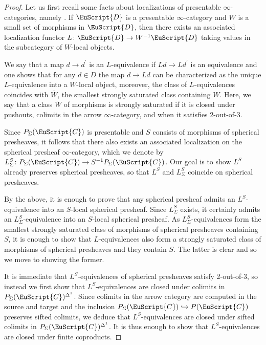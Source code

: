 \documentclass[oneside,a4paper]{amsart}
\newcommand{\euscr}[1]{\EuScript{#1}} %
\newcommand{\ccat}{\euscr{C}} %
\newcommand{\dcat}{\euscr{D}} %
\theoremstyle{plain}
\theoremstyle{definition}
\theoremstyle{remark}
\begin{document}
\begin{proof}
Let us first recall some facts about localizations of presentable $\infty$-categories, namely \cite[5.2.7.8, 5.5.4.15]{lurie_higher_topos_theory}.  If $\dcat$ is a presentable $\infty$-category and $W$ is a small set of morphisms in $\dcat$, then there exists an associated localization functor $L\colon \dcat \rightarrow W^{-1}\dcat$ taking values in the subcategory of $W$-local objects. 

We say that a map $d \rightarrow d^{\prime}$ is an $L$-equivalence if $Ld \rightarrow Ld^{\prime}$ is an equivalence and one shows that for any $d \in D$ the map $d \rightarrow Ld$ can be characterized as the unique $L$-equivalence into a $W$-local object, moreover, the class of $L$-equivalences coincides with $\overline{W}$,  the smallest strongly saturated class containing $W$. Here, we say that a class $\overline{W}$ of morphisms is strongly saturated if it is closed under pushouts, colimits in the arrow $\infty$-category, and when it satisfies 2-out-of-3. 

Since $P_{\Sigma}(\ccat)$ is presentable and $S$ consists of morphisms of spherical presheaves, it follows that there also exists an associated localization on the spherical presheaf $\infty$-category, which we denote by $L_{\Sigma}^{S} \colon P_{\Sigma}(\ccat) \rightarrow S^{-1} P_{\Sigma}(\ccat)$. Our goal is to show $L^{S}$ already preserves spherical presheaves, so that $L^{S}$ and $L_{\Sigma}^{S}$ coincide on spherical presheaves.

By the above, it is enough to prove that any spherical presheaf admits an $L^{S}$-equivalence into an $S$-local spherical presheaf. Since $L_{\Sigma}^{S}$ exists, it certainly admits an $L_{\Sigma}^{S}$-equivalence into an $S$-local spherical presheaf. As $L_{\Sigma}^{S}$-equivalences form the smallest strongly saturated class of morphisms of spherical presheaves containing $S$, it is enough to show that $L$-equivalences also form a strongly saturated class of morphisms of spherical presheaves and they contain $S$. The latter is clear and so we move to showing the former. 

It is immediate that $L^{S}$-equivalences of spherical presheaves satisfy 2-out-of-3, so instead we first show that $L^{S}$-equivalences are closed under colimits in $P_{\Sigma}(\ccat)^{\Delta^{1}}$. Since colimits in the arrow category are computed in the source and target and the inclusion $P_{\Sigma}(\ccat) \hookrightarrow P(\ccat)$ preserves sifted colimits, we deduce that $L^{S}$-equivalences are closed under sifted colimits in $P_{\Sigma}(\ccat)^{\Delta^{1}}$. It is thus enough to show that $L^{S}$-equivalences are closed under finite coproducts. 


\end{proof}
\end{document}

